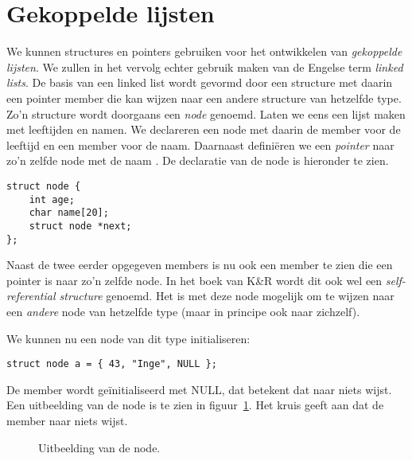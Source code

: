 \section{Gekoppelde lijsten}
We kunnen structures en pointers gebruiken voor het ontwikkelen van \textsl{gekoppelde lijsten}. We zullen in het vervolg echter gebruik maken van de Engelse term \textsl{linked lists}. De basis van een linked list wordt gevormd door een structure met daarin een pointer member die kan wijzen naar een andere structure van hetzelfde type. Zo'n structure wordt doorgaans een \textsl{node} genoemd. Laten we eens een lijst maken met leeftijden en namen. We declareren een node met daarin de member  voor de leeftijd en een member  voor de naam. Daarnaast definiëren we een \textsl{pointer} naar zo'n zelfde node met de naam . De declaratie van de node is hieronder te zien.

\begin{lstlisting}[style=lstoneline]
struct node {
	int age;
	char name[20];
	struct node *next;
};
\end{lstlisting}

Naast de twee eerder opgegeven members is nu ook een member  te zien die een pointer is naar zo'n zelfde node. In het boek van K\&R wordt dit ook wel een \textsl{self-referential structure} genoemd. Het is met deze node mogelijk om te wijzen naar een \textsl{andere} node van hetzelfde type (maar in principe ook naar zichzelf).

We kunnen nu een node van dit type initialiseren:

\begin{lstlisting}[style=lstoneline]
struct node a = { 43, "Inge", NULL };
\end{lstlisting}

De member  wordt geïnitialiseerd met NULL, dat betekent dat  naar niets wijst. Een uitbeelding van de node is te zien in figuur~\ref{fig:strstr1}. Het kruis geeft aan dat de member  naar niets wijst.

\begin{figure}[!ht]
\centering
{}
\caption{Uitbeelding van de node.}
\label{fig:strstr1}
\end{figure}

